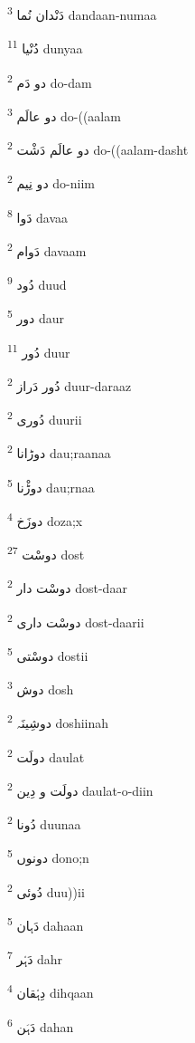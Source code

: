 \documentclass[12pt]{article}
\begin{document}
\begin{RTL}
\begin{multicols}{5}
{\ur دَنْدان نُما}   \textsuperscript{3} dandaan-numaa

{\ur دُنْیا}   \textsuperscript{11} dunyaa

{\ur دو دَم}   \textsuperscript{2} do-dam

{\ur دو عالَم}   \textsuperscript{3} do-((aalam

{\ur دو عالَم دَشْت}   \textsuperscript{2} do-((aalam-dasht

{\ur دو نِیم}   \textsuperscript{2} do-niim

{\ur دَوا}   \textsuperscript{8} davaa

{\ur دَوام}   \textsuperscript{2} davaam

{\ur دُود}   \textsuperscript{9} duud

{\ur دور}   \textsuperscript{5} daur

{\ur دُور}   \textsuperscript{11} duur

{\ur دُور دَراز}   \textsuperscript{2} duur-daraaz

{\ur دُوری}   \textsuperscript{2} duurii

{\ur دوڑانا}   \textsuperscript{2} dau;raanaa

{\ur دوڑْنا}   \textsuperscript{5} dau;rnaa

{\ur دوزَخ}   \textsuperscript{4} doza;x

{\ur دوسْت}   \textsuperscript{27} dost

{\ur دوسْت دار}   \textsuperscript{2} dost-daar

{\ur دوسْت داری}   \textsuperscript{2} dost-daarii

{\ur دوسْتی}   \textsuperscript{5} dostii

{\ur دوش}   \textsuperscript{3} dosh

{\ur دوشِینَہ}   \textsuperscript{2} doshiinah

{\ur دولَت}   \textsuperscript{2} daulat

{\ur دولَت و دِین}   \textsuperscript{2} daulat-o-diin

{\ur دُونا}   \textsuperscript{2} duunaa

{\ur دونوں}   \textsuperscript{5} dono;n

{\ur دُوئی}   \textsuperscript{2} duu))ii

{\ur دَہان}   \textsuperscript{5} dahaan

{\ur دَہْر}   \textsuperscript{7} dahr

{\ur دِہْقان}   \textsuperscript{4} dihqaan

{\ur دَہَن}   \textsuperscript{6} dahan


\end{multicols}
\end{RTL}
\end{document}
